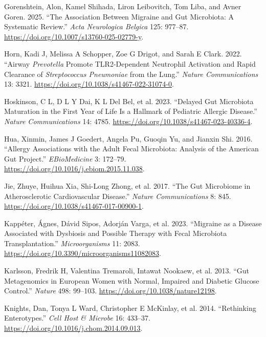 \documentclass[
  11pt,
]{article}
\newlength{\cslhangindent}
\newenvironment{CSLReferences}[2] %
 {\begin{list}{}{%
  \setlength{\itemindent}{0pt}
  \setlength{\leftmargin}{0pt}
  \setlength{\parsep}{0pt}
  \ifodd #1
   \setlength{\leftmargin}{\cslhangindent}
   \setlength{\itemindent}{-1\cslhangindent}
  \fi
  \setlength{\itemsep}{#2\baselineskip}}}
 {\end{list}}
\begin{document}
\begin{CSLReferences}{1}{0}
Gorenshtein, Alon, Kamel Shihada, Liron Leibovitch, Tom Liba, and Avner
Goren. 2025. {``The Association Between Migraine and Gut Microbiota: A
Systematic Review.''} \emph{Acta Neurologica Belgica} 125: 977--87.
\url{https://doi.org/10.1007/s13760-025-02779-y}.

Horn, Kadi J, Melissa A Schopper, Zoe G Drigot, and Sarah E Clark. 2022.
{``Airway \emph{{P}revotella} Promote {TLR2}-Dependent Neutrophil
Activation and Rapid Clearance of \emph{{S}treptococcus Pneumoniae} from
the Lung.''} \emph{Nature Communications} 13: 3321.
\url{https://doi.org/10.1038/s41467-022-31074-0}.

Hoskinson, C L, D L Y Dai, K L Del Bel, et al. 2023. {``Delayed Gut
Microbiota Maturation in the First Year of Life Is a Hallmark of
Pediatric Allergic Disease.''} \emph{Nature Communications} 14: 4785.
\url{https://doi.org/10.1038/s41467-023-40336-4}.

Hua, Xinmin, James J Goedert, Angela Pu, Guoqin Yu, and Jianxin Shi.
2016. {``Allergy Associations with the Adult Fecal Microbiota: Analysis
of the {A}merican {G}ut {P}roject.''} \emph{EBioMedicine} 3: 172--79.
\url{https://doi.org/10.1016/j.ebiom.2015.11.038}.

Jie, Zhuye, Huihua Xia, Shi-Long Zhong, et al. 2017. {``The Gut
Microbiome in Atherosclerotic Cardiovascular Disease.''} \emph{Nature
Communications} 8: 845.
\url{https://doi.org/10.1038/s41467-017-00900-1}.

Kappéter, Ágnes, Dávid Sipos, Adorján Varga, et al. 2023. {``Migraine as
a Disease Associated with Dysbiosis and Possible Therapy with Fecal
Microbiota Transplantation.''} \emph{Microorganisms} 11: 2083.
\url{https://doi.org/10.3390/microorganisms11082083}.

Karlsson, Fredrik H, Valentina Tremaroli, Intawat Nookaew, et al. 2013.
{``Gut Metagenomics in {E}uropean Women with Normal, Impaired and
Diabetic Glucose Control.''} \emph{Nature} 498: 99--103.
\url{https://doi.org/10.1038/nature12198}.

Knights, Dan, Tonya L Ward, Christopher E McKinlay, et al. 2014.
{``Rethinking Enterotypes.''} \emph{Cell Host \& Microbe} 16: 433--37.
\url{https://doi.org/10.1016/j.chom.2014.09.013}.


\end{CSLReferences}
\end{document}
